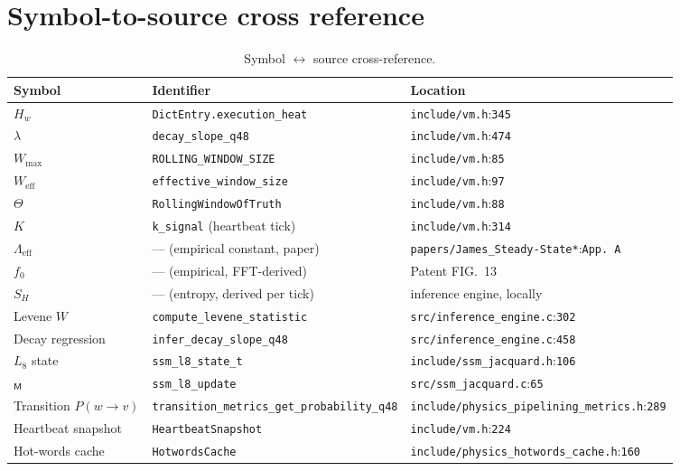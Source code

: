 \documentclass[11pt,letterpaper,openany]{book}
\theoremstyle{definition}
\theoremstyle{plain}
\newcommand{\Lambdaeff}{\Lambda_{\mathrm{eff}}}
\newcommand{\Weff}{W_{\mathrm{eff}}}
\newcommand{\Wmax}{W_{\mathrm{max}}}
\newcommand{\Loop}[1]{L_{#1}}
\newcommand{\sourceref}[2]{\texttt{#1}:\texttt{#2}}
\begin{document}
\section{Symbol-to-source cross reference}

\begin{table}[H]
  \centering\small
  \begin{tabular}{l l l}
    \toprule
    Symbol & Identifier & Location \\
    \midrule
    $H_w$           & \texttt{DictEntry.execution\_heat}     & \sourceref{include/vm.h}{345} \\
    $\lambda$       & \texttt{decay\_slope\_q48}             & \sourceref{include/vm.h}{474} \\
    $\Wmax$         & \texttt{ROLLING\_WINDOW\_SIZE}         & \sourceref{include/vm.h}{85} \\
    $\Weff$         & \texttt{effective\_window\_size}       & \sourceref{include/vm.h}{97} \\
    $\Theta$        & \texttt{RollingWindowOfTruth}          & \sourceref{include/vm.h}{88} \\
    $K$             & \texttt{k\_signal} (heartbeat tick)    & \sourceref{include/vm.h}{314} \\
    $\Lambdaeff$    & --- (empirical constant, paper)        & \sourceref{papers/James\_Steady-State*}{App.~A} \\
    $f_0$           & --- (empirical, FFT-derived)           & Patent FIG.~13 \\
    $S_H$           & --- (entropy, derived per tick)        & inference engine, locally \\
    Levene $W$      & \texttt{compute\_levene\_statistic}    & \sourceref{src/inference\_engine.c}{302} \\
    Decay regression & \texttt{infer\_decay\_slope\_q48}     & \sourceref{src/inference\_engine.c}{458} \\
    $\Loop{8}$ state & \texttt{ssm\_l8\_state\_t}            & \sourceref{include/ssm\_jacquard.h}{106} \\
    $\sf_M$          & \texttt{ssm\_l8\_update}              & \sourceref{src/ssm\_jacquard.c}{65} \\
    Transition $P(w\to v)$ & \texttt{transition\_metrics\_get\_probability\_q48} & \sourceref{include/physics\_pipelining\_metrics.h}{289} \\
    Heartbeat snapshot & \texttt{HeartbeatSnapshot}          & \sourceref{include/vm.h}{224} \\
    Hot-words cache & \texttt{HotwordsCache}                  & \sourceref{include/physics\_hotwords\_cache.h}{160} \\
    \bottomrule
  \end{tabular}
  \caption{Symbol $\leftrightarrow$ source cross-reference.}
\end{table}
\end{document}
